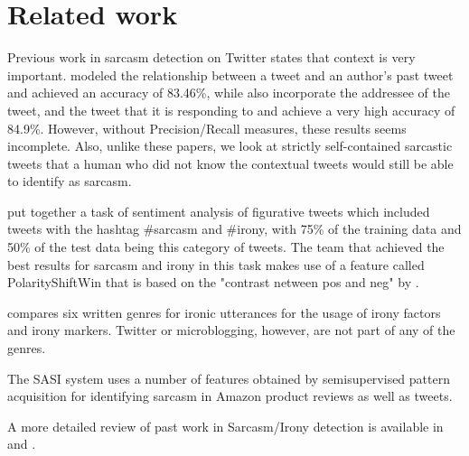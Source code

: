 \documentclass[11pt]{article}
\begin{document}
\section{Related work}

Previous work in sarcasm detection on Twitter states that context is very important. \cite{rajadesingan2015sarcasm} modeled the relationship between a tweet and an author’s past tweet and achieved an accuracy of 83.46\%, while \cite{bamman2015contextualized} also incorporate the addressee of the tweet, and the tweet that it is responding to and achieve a very high accuracy of 84.9\%.  However, without Precision/Recall measures, these results seems incomplete. Also, unlike these papers, we look at strictly self-contained sarcastic tweets that a human who did not know the contextual tweets would still be able to identify as sarcasm.

\cite{ghosh2015semeval} put together a task of sentiment analysis of figurative tweets which included tweets with the hashtag \#sarcasm and \#irony, with 75\% of the training data and 50\% of the test data being this category of tweets. The team that achieved the best results for sarcasm and irony in this task \cite{xu2015llt} makes use of a feature called PolarityShiftWin that is based on the "contrast netween pos and neg" by \cite{riloff2013sarcasm}.

\cite{burgers2012verbal} compares six written genres for ironic utterances for the usage of irony factors and irony markers. Twitter or microblogging, however, are not part of any of the genres.

The SASI system \cite{davidov2010semi} uses a number of features obtained by semisupervised pattern acquisition for identifying sarcasm in Amazon product reviews as well as tweets.

A more detailed review of past work in Sarcasm/Irony detection is available in \cite{tungthamthiti2015sentiment} and \cite{xu2015llt}.
 
 
\end{document}
